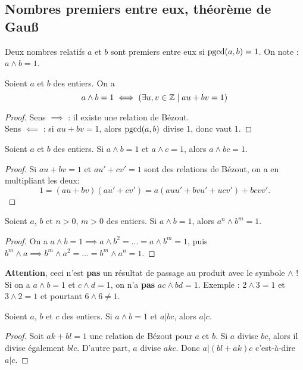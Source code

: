 \subsection{Nombres premiers entre eux, théorème de Gau{\ss}}

\begin{definition}
Deux nombres relatifs $a$ et $b$ sont premiers entre eux si $\operatorname{pgcd}(a,b)=1$. On note :  $a\wedge b = 1$.
\end{definition}

\begin{proposition} Soient $a$ et $b$ des entiers. On a 
\[
a\wedge b = 1 \iff \left(\exists u, v\in \mathbb{Z}\mid au+bv=1\right)
\]
\end{proposition}
\begin{proof}
Sens $\implies$ : il existe une relation de Bézout.\\
Sens $\impliedby$ : si $au+bv=1$, alors  $\operatorname{pgcd}(a,b)$ divise $1$, donc vaut $1$.
\end{proof}

\begin{proposition}
Soient $a$ et $b$ des entiers.
Si $a\wedge b = 1$ et $a\wedge c = 1$, alors $a\wedge bc=1$.
\end{proposition}
\begin{proof}
Si $au+bv=1$ et $au'+cv'=1$ sont des relations de Bézout, on a en multipliant les deux:
\[ 1 = (au+bv)(au'+cv') = a(auu'+bvu'+ucv')+bcvv'.\]
\end{proof}
\begin{corollaire}
Soient $a$, $b$ et $n>0$, $m>0$ des entiers.
Si $a\wedge b = 1$, alors $a^n\wedge b^m=1$.
\end{corollaire}
\begin{proof}
On a $a\wedge b = 1 \implies a\wedge b^2= ... =  a\wedge b^m=1$, puis $b^m\wedge a  \implies b^m\wedge a^2 = ... = b^m\wedge a^n=1$.
\end{proof}

\textbf{Attention}, ceci n'est \textbf{pas} un résultat de passage au produit avec le symbole $\wedge$ ! Si on a $a\wedge b = 1$ et $c\wedge d = 1$, on n'a \textbf{pas} $ac\wedge bd=1$. Exemple  : $2\wedge 3=1$ et $3\wedge 2=1$ et pourtant $6\wedge 6\neq 1$.

\begin{theoreme}
Soient $a$, $b$ et $c$ des entiers.
Si $a\wedge b = 1$ et $a|bc$, alors $a|c$.
\end{theoreme}
\begin{proof}
Soit $ak+bl=1$ une relation de Bézout pour $a$ et $b$.
Si $a$ divise $bc$, alors il divise également $blc$. D'autre part, $a$ divise $akc$. Donc $a | (bl+ak)c$ c'est-à-dire $a|c$.
\end{proof}

